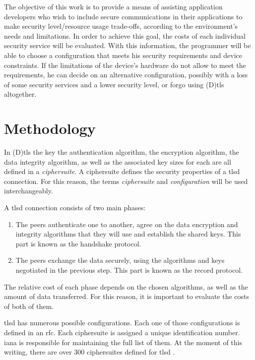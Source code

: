 \documentclass{llncs}
\begin{document}
The objective of this work is to provide a means of assisting application developers
who wish to include secure communications in their applications to make
security level/resource usage trade-offs, according to the environment's needs
and limitations. In order to achieve this goal, the costs of each individual security service
will be evaluated. With this information, the programmer will be able to choose a configuration that
meets his security requirements and device constraints. If the limitations of the device's hardware
do not allow to meet the requirements, he can decide on an alternative configuration, possibly with
a loss of some security services and a lower security level, or forgo using (D)\gls{tls} altogether.

\section{Methodology}

In (D)\gls{tls} the key the authentication algorithm, the encryption algorithm, the
data integrity algorithm, as well as the associated key sizes for each are all defined in a \textit{ciphersuite}.
A ciphersuite defines the security properties of a \acrshort{tlsd} connection. For this reason, the terms
\textit{ciphersuite} and \textit{configuration} will be used interchangeably.

A \gls{tlsd} connection consists of two main phases:
\begin{enumerate}
  \item The peers authenticate one to another, agree on the data encryption and integrity
  algorithms that they will use and establish the shared keys. This part is known as the handshake protocol.
 \item The peers exchange the data securely, using the algorithms and keys negotiated in
the previous step. This part is known as the record protocol.
\end{enumerate}

The relative cost of each phase depends on the chosen algorithms, as well as the amount of data
transferred. For this reason, it is important to evaluate the costs of both of them.

\acrshort{tlsd} has numerous possible configurations. Each one of those configurations is defined
in an \gls{rfc}. Each ciphersuite is assigned a unique identification number. \gls{iana} is responsible for
maintaining the full list of them. At the moment of this writing, there are over $300$ ciphersuites
defined for \gls{tlsd} \cite{IANA_ciphers_list:online}.
\end{document}
